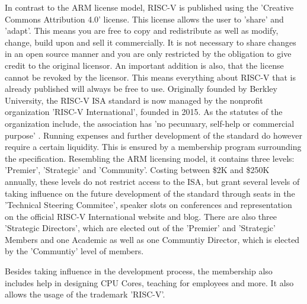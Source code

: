 \documentclass[conference]{IEEEtran}
\begin{document}
	In contrast to the ARM license model, RISC-V is published using the 'Creative Commons Attribution 4.0' license. \cite{Waterman2017}\cite{Waterman2017a} This license allows the user to 'share' and 'adapt'. This means you are free to copy and redistribute as well as modify, change, build upon and sell it commercially. It is not necessary to share changes in an open source manner and you are only restricted by the obligation to give credit to the original licensor. \cite{CC} An important addition is also, that the license cannot be revoked by the licensor. This means everything about RISC-V that is already published will always be free to use.
	Originally founded by Berkley University, the RISC-V \gls{ISA} standard is now managed by the nonprofit organization 'RISC-V International', founded in 2015. \cite{RVIAbout} As the statutes of the organization include, the association has 'no pecunuary, self-help or commercial purpose' \cite{RVIArt}. Running expenses and further development of the standard do however require a certain liquidity. This is ensured by a membership program surrounding the specification. \cite{RVIMem} Resembling the ARM licensing model, it contains three levels: 'Premier', 'Strategic' and 'Community'. Costing between \$2K and \$250K annually, these levels do not restrict access to the \gls{ISA}, but grant several levels of taking influence on the future development of the standard through seats in the 'Technical Steering Commitee', speaker slots on conferences and representation on the official RISC-V International website and blog. There are also three 'Strategic Directors', which are elected out of the 'Premier' and 'Strategic' Members and one Academic as well as one Communtiy Director, which is elected by the 'Communtiy' level of members. \cite{RVIAss}

	Besides taking influence in the development process, the membership also includes help in designing \gls{CPU} Cores, teaching for employees and more. It also allows the usage of the trademark 'RISC-V'.
\end{document}
